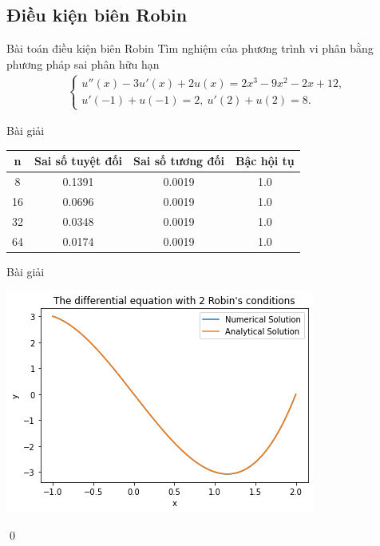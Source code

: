\documentclass[9pt]{beamer}
\numberwithin{equation}{section}
\begin{document}
\subsection{Điều kiện biên Robin}

\begin{frame}
\begin{block}{Bài toán điều kiện biên Robin}
    Tìm nghiệm của phương trình vi phân bằng phương pháp sai phân hữu hạn
    \begin{align*}
    \begin{cases}
        u''(x) - 3u'(x) + 2u(x) = 2x^3 - 9x^2 - 2x + 12, \\
        u'(-1) + u(-1) = 2, \ u'(2) + u(2) = 8.
    \end{cases}
    \end{align*}
\end{block}

\begin{exampleblock}{Bài giải}
    \begin{center}\begin{tabular}{||c|c|c|c||}
    \hline
    n & Sai số tuyệt đối & Sai số tương đối & Bậc hội tụ \\
    \hline\hline
    8   & 0.1391 & 0.0019 & 1.0 \\
    16  & 0.0696 & 0.0019 & 1.0 \\
    32  & 0.0348 & 0.0019 & 1.0 \\
    64  & 0.0174 & 0.0019 & 1.0 \\
    \hline
    \end{tabular}\end{center}
\end{exampleblock}
\end{frame}

\begin{frame}
\begin{exampleblock}{Bài giải}
    \begin{center}
        \includegraphics[scale=0.5]{img/midterm4}
    \end{center}
    \qed
\end{exampleblock} 
\end{frame}
\end{document}
